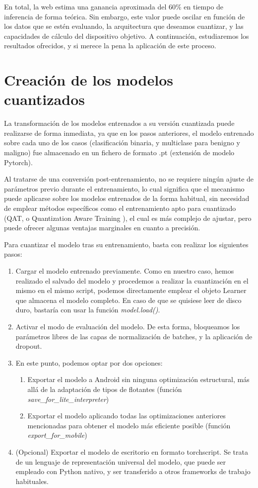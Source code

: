 En total, la web  \cite{pmobile} estima una ganancia aproximada del 60\% en tiempo de inferencia de forma teórica. Sin embargo, este valor puede oscilar en función de los datos que se estén evaluando, la arquitectura que deseamos cuantizar, y las capacidades de cálculo del dispositivo objetivo. A continuación, estudiaremos los resultados ofrecidos, y si merece la pena la aplicación de este proceso.

\section{Creación de los modelos cuantizados}

La transformación de los modelos entrenados a su versión cuantizada puede realizarse de forma inmediata, ya que en los pasos anteriores, el modelo entrenado sobre cada uno de los casos (clasificación binaria, y multiclase para benigno y maligno) fue almacenado en un fichero de formato .pt (extensión de modelo Pytorch).

Al tratarse de una conversión post-entrenamiento, no se requiere ningún ajuste de parámetros previo durante el entrenamiento, lo cual significa que el mecanismo puede aplicarse sobre los modelos entrenados de la forma habitual, sin necesidad de emplear métodos específicos como el entrenamiento apto para cuantizado (QAT, o Quantization Aware Training  \cite{kuzmin2024fp8}), el cual es más complejo de ajustar, pero puede ofrecer algunas ventajas marginales en cuanto a precisión.

Para cuantizar el modelo tras su entrenamiento, basta con realizar los siguientes pasos:
\begin{enumerate}
	\item Cargar el modelo entrenado previamente. Como en nuestro caso, hemos realizado el salvado del modelo y procedemos a realizar la cuantización en el mismo en el mismo script, podemos directamente emplear el objeto Learner que almacena el modelo completo. En caso de que se quisiese leer de disco duro, bastaría con usar la función \textit{model.load()}.
	\item Activar el modo de evaluación del modelo. De esta forma, bloqueamos los parámetros libres de las capas de normalización de batches, y la aplicación de dropout.
	\item En este punto, podemos optar por dos opciones:
	\begin{enumerate}
		\item Exportar el modelo a Android sin ninguna optimización estructural, más allá de la adaptación de tipos de flotantes (función \textit{save\_for\_lite\_interpreter})
		\item Exportar el modelo aplicando todas las optimizaciones anteriores mencionadas para obtener el modelo más eficiente posible (función \textit{export\_for\_mobile})
	\end{enumerate}
	\item (Opcional) Exportar el modelo de escritorio en formato torchscript. Se trata de un lenguaje de representación universal del modelo, que puede ser empleado con Python nativo, y ser transferido a otros frameworks de trabajo habituales.
		
\end{enumerate}

